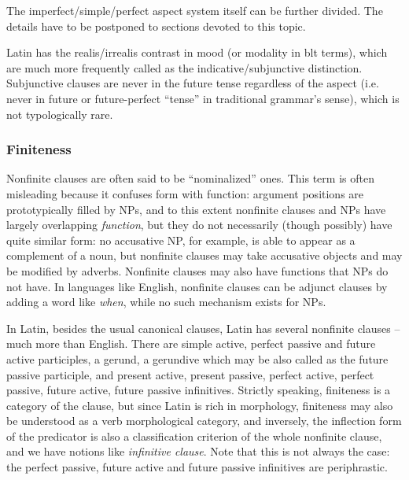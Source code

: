 \documentclass{article}
\newcommand*{\term}[1]{\emph{#1}}
\newcommand*{\corpus}[1]{\emph{#1}}
\begin{document}
The imperfect/simple/perfect aspect system itself can be further divided.
The details have to be postponed to sections devoted to this topic.

Latin has the realis/irrealis contrast in mood (or modality in \ac{blt} terms), 
which are much more frequently called as the indicative/subjunctive distinction.
Subjunctive clauses are never in the future tense regardless of the aspect
(i.e. never in future or future-perfect ``tense'' in traditional grammar's sense),
which is not typologically rare.

\subsubsection{Finiteness}\label{sec:finite-abs}

Nonfinite clauses are often said to be ``nominalized'' ones.
This term is often misleading because it confuses form with function:
argument positions are prototypically filled by NPs,
and to this extent nonfinite clauses and NPs have largely overlapping \emph{function},
but they do not necessarily (though possibly) have quite similar form:
no accusative NP, for example, is able to appear as a complement of a noun,
but nonfinite clauses may take accusative objects and may be modified by adverbs.
Nonfinite clauses may also have functions that NPs do not have.
In languages like English, nonfinite clauses can be adjunct clauses by adding a word like \corpus{when},
while no such mechanism exists for NPs.

In Latin, besides the usual canonical clauses, Latin has several nonfinite clauses -- much more than English.
There are simple active, perfect passive and future active participles,
a gerund, a gerundive which may be also called as the future passive participle, and 
present active, present passive, perfect active, perfect passive, future active, future passive infinitives.
Strictly speaking, finiteness is a category of the clause,
but since Latin is rich in morphology, finiteness may also be understood as a verb morphological category,
and inversely, the inflection form of the predicator 
is also a classification criterion of the whole nonfinite clause,
and we have notions like \term{infinitive clause}.
Note that this is not always the case:
the perfect passive, future active and future passive infinitives are periphrastic.
\end{document}
